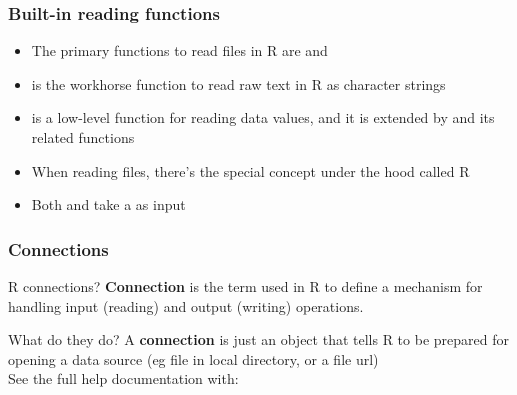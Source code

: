 \documentclass{beamer}\usepackage[]{graphicx}\usepackage[]{color}
\begin{document}
\begin{frame}
\frametitle{Built-in reading functions}

\begin{itemize}
 \item The primary functions to read files in R are  and 

 \item {} is the workhorse function to read raw text in R as character strings

 \item {} is a low-level function for reading data values, and it is extended by  and its related functions

 \item When reading files, there's the special concept under the hood called R  

 \item Both  and  take a  as input
\end{itemize}

\end{frame}


\begin{frame}
\frametitle{Connections}

\begin{block}{R connections?}
\textbf{Connection} is the term used in R to define a mechanism for handling input (reading) and output (writing) operations. 
\end{block}

\begin{block}{What do they do?}
A \textbf{connection} is just an object that tells R to be prepared for opening a data source (eg file in local directory, or a file url) \\
See the full help documentation with: 
\end{block}

\end{frame}

\end{document}
